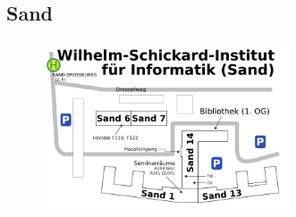 \subsection*{Sand}
\begin{figure}[ht!]
	\centering
	\includegraphics[width=0.65\textwidth]{shared/anhang/lageplaene/uebersicht_sand.pdf}
\end{figure}
